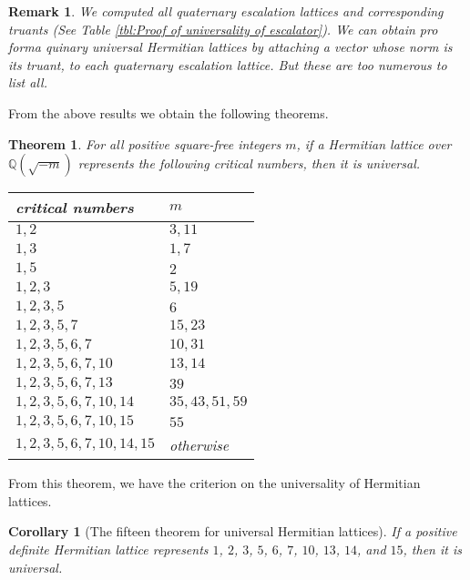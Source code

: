 \documentclass[a4paper,10pt,reqno]{amsart}
\newtheorem{Rmk}{Remark}
\newtheorem{Thm}{Theorem}
\newtheorem{Cor}{Corollary}
\begin{document}
\begin{Rmk}
We computed all quaternary escalation lattices and corresponding truants (See Table \ref{tbl:Proof
of universality of escalator}). We can obtain \emph{pro forma} quinary universal Hermitian lattices
by attaching a vector whose norm is its truant, to each quaternary escalation lattice. But these
are too numerous to list all.
\end{Rmk}

From the above results we obtain the following theorems.

\begin{Thm}
For all positive square-free integers $m$, if a Hermitian lattice over ${\mathbb{Q}(\sqrt{{-m}})}$ represents the
following critical numbers, then it is universal.\\

\begin{center}
\begin{tabular}{l|l}  \hline
critical numbers                & $m$ \\ \hline $1, 2$                          & $3, 11$ \\
$1, 3$                          & $1, 7$  \\
$1, 5$                          & $2$ \\
$1, 2, 3$                       & $5, 19$ \\
$1, 2, 3, 5$                    & $6$ \\
$1, 2, 3, 5, 7$                 & $15, 23$ \\
$1, 2, 3, 5, 6, 7$              & $10, 31$ \\
$1, 2, 3, 5, 6, 7, 10$          & $13, 14$ \\
$1, 2, 3, 5, 6, 7, 13$          & $39$\\
$1, 2, 3, 5, 6, 7, 10, 14$      & $35, 43, 51, 59$\\
$1, 2, 3, 5, 6, 7, 10, 15$      & $55$\\
$1, 2, 3, 5, 6, 7, 10, 14, 15$  & otherwise \\
\hline
\end{tabular}
\end{center}
\end{Thm}

From this theorem, we have the criterion on the universality of Hermitian lattices.

\begin{Cor}[The fifteen theorem for universal Hermitian lattices]
If a positive definite Hermitian lattice represents $1$, $2$, $3$, $5$, $6$, $7$, $10$, $13$, $14$,
and $15$, then it is universal.
\end{Cor}
\end{document}
